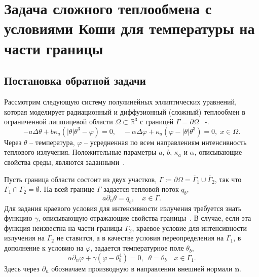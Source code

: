 \section{Задача сложного теплообмена с условиями Коши для температуры на части границы}\label{sec:ch2/sec4}

\subsection{Постановка обратной задачи}\label{subsec:ch2/sec4/subsec1}

Рассмотрим следующую систему полулинейных эллиптических уравнений, которая
моделирует радиационный и диффузионный (сложный) теплообмен в
ограниченной липшицевой области $\Omega\subset \mathbb{R}^3$ с границей
$\Gamma=\partial\Omega$ ~\cite{Pinnau2007}-\cite{Kovtanyuk2014a}.
\begin{equation}
    \label{eq:2_4:eq1}
    - a\Delta\theta + b\kappa_a(|\theta|\theta^3- \varphi)=0,   \quad
    -\alpha \Delta \varphi + \kappa_a(\varphi-|\theta|\theta^3)=0,\; x\in\Omega.
\end{equation}
Через $\theta$ -- температура,  $\varphi$ -- усредненная по всем
направлениям интенсивность теплового излучения.
Положительные параметры
$a$, $b$, $\kappa_a$ и $\alpha$, описывающие
свойства среды, являются заданными~\cite{Kovtanyuk2014a}.


Пусть граница области состоит из двух участков, $\Gamma \coloneqq \partial \Omega =\overline{\Gamma}_1 \cup \overline{\Gamma}_2$,
так что $\Gamma_1 \cap \Gamma_2 =  \emptyset$.
На всей границе $\Gamma$ задается тепловой поток $q_b$,
\begin{equation}
    \label{eq:2_4:bc1}
    a\partial_n\theta = q_b, \quad x\in \Gamma.
\end{equation}
Для задания краевого условия для интенсивности излучения
требуется знать функцию $\gamma$, описывающую отражающие свойства границы~\cite{JVM-14}.
В случае, если эта функция неизвестна на части границы $\Gamma_2$,
краевое условие для интенсивности излучения на $\Gamma_2$ не ставится, а в качестве условия
переопределения на $\Gamma_1$, в дополнение к условию на
$\varphi$, задается температурное поле $\theta_b$,
\begin{equation}
    \label{eq:2_4:bc2}
    \alpha\partial_n\varphi + \gamma (\varphi - \theta_b ^4 ) = 0,\;\;
    \theta=\theta_b\quad x\in \Gamma_1.
\end{equation}
Здесь через $\partial_n$ обозначаем производную в направлении
внешней нормали $\mathbf n$.

